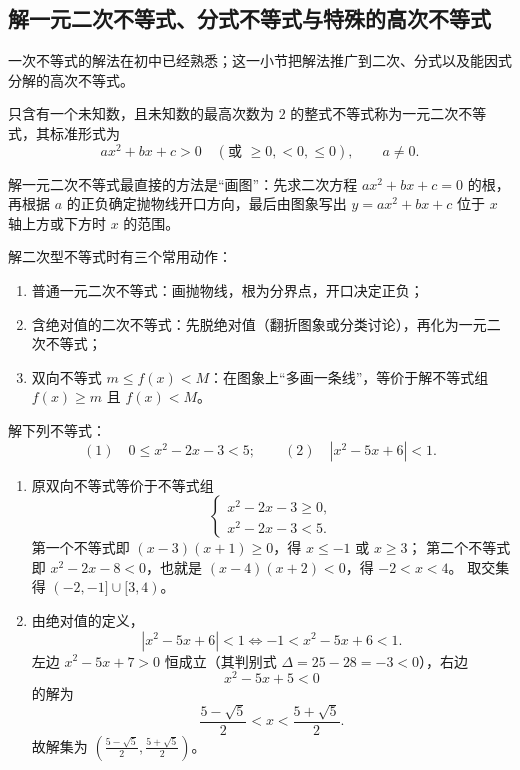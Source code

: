 \subsection{解一元二次不等式、分式不等式与特殊的高次不等式}
一次不等式的解法在初中已经熟悉；这一小节把解法推广到二次、分式以及能因式分解的高次不等式。
\begin{definition}[一元二次不等式]
  只含有一个未知数，且未知数的最高次数为 \(2\) 的整式不等式称为一元二次不等式，其标准形式为
  \[
  ax^2+bx+c>0\quad(\text{或 }\ge 0,<0,\le 0),\qquad a\ne 0.
  \]
\end{definition}
解一元二次不等式最直接的方法是“画图”：先求二次方程 \(ax^2+bx+c=0\) 的根，再根据 \(a\) 的正负确定抛物线开口方向，最后由图象写出 \(y=ax^2+bx+c\) 位于 \(x\) 轴上方或下方时 \(x\) 的范围。
\begin{experience}
  解二次型不等式时有三个常用动作：
  \begin{enumerate}
    \item 普通一元二次不等式：画抛物线，根为分界点，开口决定正负；
    \item 含绝对值的二次不等式：先脱绝对值（翻折图象或分类讨论），再化为一元二次不等式；
    \item 双向不等式 \(m\le f(x)<M\)：在图象上“多画一条线”，等价于解不等式组 \(f(x)\ge m\) 且 \(f(x)<M\)。
  \end{enumerate}
\end{experience}

\begin{example}
  解下列不等式：
  \[
  (1)\quad 0\le x^2-2x-3<5;\qquad
  (2)\quad |x^2-5x+6|<1.
  \]
\end{example}
\begin{jie}
  \begin{enumerate}
    \item 原双向不等式等价于不等式组
    \[
    \begin{cases}
      x^2-2x-3\ge 0,\\
      x^2-2x-3<5.
    \end{cases}
    \]
    第一个不等式即 \((x-3)(x+1)\ge 0\)，得 \(x\le -1\) 或 \(x\ge 3\)；
    第二个不等式即 \(x^2-2x-8<0\)，也就是 \((x-4)(x+2)<0\)，得 \(-2<x<4\)。
    取交集得 \((-2,-1]\cup[3,4)\)。
    \item 由绝对值的定义，
    \[
    |x^2-5x+6|<1\iff -1<x^2-5x+6<1.
    \]
    左边 \(x^2-5x+7>0\) 恒成立（其判别式 \(\Delta=25-28=-3<0\)），右边
    \[
    x^2-5x+5<0
    \]
    的解为
    \[
    \frac{5-\sqrt5}{2}<x<\frac{5+\sqrt5}{2}.
    \]
    故解集为 \(\left(\frac{5-\sqrt5}{2},\frac{5+\sqrt5}{2}\right)\)。
  \end{enumerate}
\end{jie}

